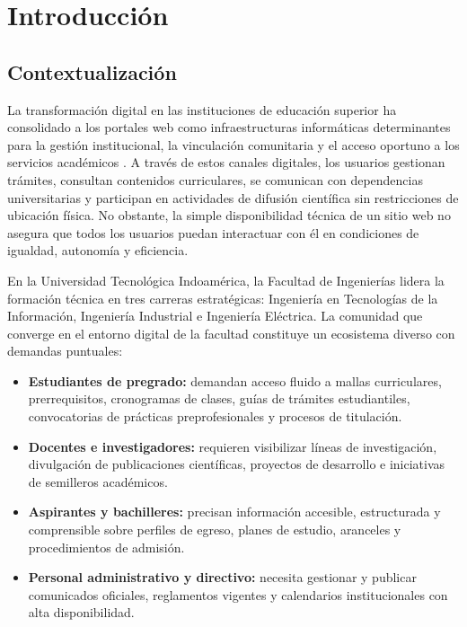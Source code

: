 \chapter{Introducción}
\label{chap:introduccion}

\section{Contextualización}
La transformación digital en las instituciones de educación superior ha consolidado a los portales web como infraestructuras informáticas determinantes para la gestión institucional, la vinculación comunitaria y el acceso oportuno a los servicios académicos \cite{almarashdeh2020portals}. A través de estos canales digitales, los usuarios gestionan trámites, consultan contenidos curriculares, se comunican con dependencias universitarias y participan en actividades de difusión científica sin restricciones de ubicación física. No obstante, la simple disponibilidad técnica de un sitio web no asegura que todos los usuarios puedan interactuar con él en condiciones de igualdad, autonomía y eficiencia.

En la Universidad Tecnológica Indoamérica, la Facultad de Ingenierías lidera la formación técnica en tres carreras estratégicas: Ingeniería en Tecnologías de la Información, Ingeniería Industrial e Ingeniería Eléctrica. La comunidad que converge en el entorno digital de la facultad constituye un ecosistema diverso con demandas puntuales:
\begin{itemize}
  \item \textbf{Estudiantes de pregrado:} demandan acceso fluido a mallas curriculares, prerrequisitos, cronogramas de clases, guías de trámites estudiantiles, convocatorias de prácticas preprofesionales y procesos de titulación.
  \item \textbf{Docentes e investigadores:} requieren visibilizar líneas de investigación, divulgación de publicaciones científicas, proyectos de desarrollo e iniciativas de semilleros académicos.
  \item \textbf{Aspirantes y bachilleres:} precisan información accesible, estructurada y comprensible sobre perfiles de egreso, planes de estudio, aranceles y procedimientos de admisión.
  \item \textbf{Personal administrativo y directivo:} necesita gestionar y publicar comunicados oficiales, reglamentos vigentes y calendarios institucionales con alta disponibilidad.
\end{itemize}

